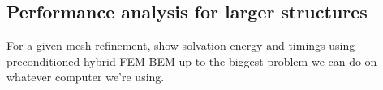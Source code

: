 \subsection*{\sffamily \large Performance analysis for larger structures}

For a given mesh refinement, show solvation energy and timings using preconditioned hybrid FEM-BEM up to the biggest problem we can do on whatever computer we're using.